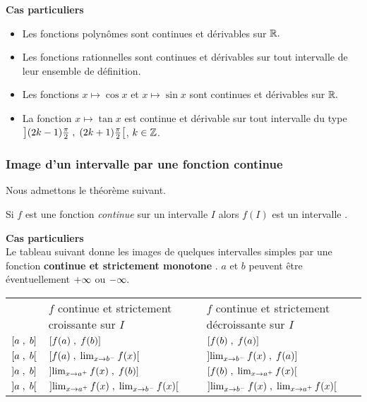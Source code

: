 \textbf{Cas particuliers}
\begin{itemize}
\item Les fonctions polynômes sont continues et dérivables sur $ \mathbb{R}. $ 
\item Les fonctions rationnelles sont continues et dérivables sur tout intervalle de leur ensemble de définition.
\item Les fonctions $x\mapsto\cos x $ et  $x\mapsto\sin x $ sont continues et dérivables sur $ \mathbb{R}. $
\item La fonction $x\mapsto\tan x $ est continue et dérivable sur tout intervalle du type $\left](2k-1)\frac{\pi}{2} \;,\; (2k+1)\frac{\pi}{2}\right[$, $ k\in\mathbb{Z} $.

\end{itemize}
\subsubsection*{Image d'un intervalle par une fonction continue}
Nous admettons le théorème suivant.
\begin{theorem}
Si $ f $ est une fonction \emph{continue} sur  un intervalle $ I $ alors $ f(I) $ est un intervalle .
\end{theorem}
\textbf{Cas particuliers}\\
Le tableau suivant donne les images de quelques intervalles simples par une fonction \textbf{continue et strictement monotone }.  $ a$ et $b $ peuvent être éventuellement $+\infty $ ou $-\infty .$ 

\begin{tabularx}{\textwidth}{|>{\centering\arraybackslash}p{1cm}|>{\centering\arraybackslash}X|>{\centering\arraybackslash}X|}
\cline{1-3}
\multicolumn{1}{|c|}{} & \multicolumn{2}{c|}{$ f(I) $} \\
\cline{2-3}
\multicolumn{1}{|c|}{$I$ intervalle} & $f$ continue et strictement croissante sur $ I $ &  $ f $ continue et strictement décroissante sur $ I $ \\
\hline
 $\left[a\;,\; b\right]$ & $\left[f(a)\;,\; f(b)\right]$ & $\left[f(b)\;,\; f(a)\right]$ \\
\hline
$ \left[a \;,\; b\right[$ & $\small \left[f(a) \;,\;  \lim_{x \to b^{-}}f(x)\right[$ & $\small\left]\lim_{x \to b^{-}}f(x)  \;, \;f(a)\right]$ \\
\hline
$ \left]a \;, \;b\right]$ & $\small\left]\lim_{x \to a^{+}}f(x) \;, \;f(b)\right]$ & $\small\left[f(b) \;,\; \lim_{x \to a^{+}}f(x)\right[$ \\
\hline
$ \left]a \;,\; b\right[$ & $\small\left]\lim_{x \to a^{+}}f(x) \;,\; \lim_{x \to b^{-}}f(x)\right[$ & $\small\left]\lim_{x \to b^{-}}f(x) \;,\; \lim_{x \to a^{+}}f(x)\right[$ \\
\hline
\end{tabularx}

